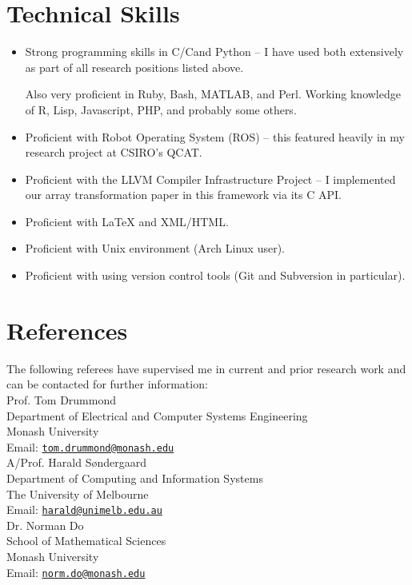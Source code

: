 \documentclass[12pt,a4paper]{article}
\newcommand{\mailto}[1]{\href{mailto:#1}{\texttt{#1}}}
\newcommand{\CPP}
{C\nolinebreak[4]\hspace{-.05em}\raisebox{.22ex}{\footnotesize\bf ++ }}
\begin{document}
\section*{Technical Skills}
\begin{itemize}
  \item Strong programming skills in C/\CPP and Python -- I have used both
    extensively as part of all research positions listed above.

    Also very proficient in Ruby, Bash, MATLAB, and Perl. Working knowledge of
    R, Lisp, Javascript, PHP, and probably some others.
  \item Proficient with Robot Operating System (ROS) -- this featured heavily
    in my research project at CSIRO's QCAT.
  \item Proficient with the LLVM Compiler Infrastructure Project -- I
    implemented our array transformation paper in this framework via its \CPP
    API.
	\item Proficient with {\LaTeX} and XML/HTML.
  \item Proficient with Unix environment (Arch Linux user).
  \item Proficient with using version control tools (Git and Subversion in
    particular).
\end{itemize}

\pagebreak

\section*{References}
The following referees have supervised me in current and prior research work
and can be contacted for further information: \\

\noindent
Prof. Tom Drummond  \\
Department of Electrical and Computer Systems Engineering \\
Monash University \\
Email: \mailto{tom.drummond@monash.edu} \\

\noindent
A/Prof. Harald S\o ndergaard  \\
Department of Computing and Information Systems \\
The University of Melbourne \\
Email: \mailto{harald@unimelb.edu.au} \\

\noindent
Dr. Norman Do \\
School of Mathematical Sciences \\
Monash University \\
Email: \mailto{norm.do@monash.edu} \\
\end{document}
